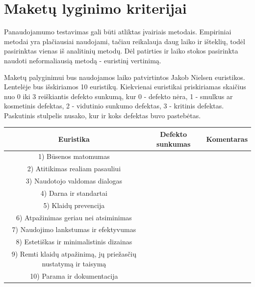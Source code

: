 \documentclass{VUMIFPSkursinis}
\begin{document}
\section{Maketų lyginimo kriterijai}
Panaudojamumo testavimas gali būti atliktas įvairiais metodais. Empiriniai metodai yra plačiausiai naudojami\cite{NielsenUsabilityEn}, tačiau reikalauja daug laiko ir išteklių, todėl pasirinktas vienas iš analitinių metodų. Dėl patirties ir laiko stokos pasirinkta naudoti neformaliausią metodą - euristinį vertinimą.

Maketų palyginimui bus naudojamos laiko patvirtintos Jakob Nielsen euristikos\cite{NielsenHeuristicsEn}. Lentelėje bus išskiriamos 10 euristikų. Kiekvienai euristikai priskiriamas skaičius nuo 0 iki 3 reiškiantis defekto sunkumą, kur 0 - defekto nėra, 1 - smulkus ar kosmetinis defektas, 2 - vidutinio sunkumo defektas, 3 - kritinis defektas. Paskutinis stulpelis nusako, kur ir koks defektas buvo pastebėtas.%
\begin{center}
\begin{tabular}{ |c|c|c| } 
 \hline
	Euristika & Defekto sunkumas & Komentaras \\ \hline
	1) Būsenos matomumas &  &  \\ \hline
	2) Atitikimas realiam pasauliui  &  &  \\ \hline
	3) Naudotojo valdomas dialogas &  &  \\ \hline
	4) Darna ir standartai &  &  \\ \hline
	5) Klaidų prevencija &  &  \\ \hline
	6) Atpažinimas geriau nei atsiminimas &  &  \\ \hline
	7) Naudojimo lankstumas ir efektyvumas &  &  \\ \hline
	8) Estetiškas ir minimalistinis dizainas &  &  \\ \hline
	9) Remti klaidų atpažinimą, jų priežasčių nustatymą ir taisymą &  &  \\ \hline
	10) Parama ir dokumentacija &  &  \\ \hline
\end{tabular}
\label{euristikųlentelėpvz}
\end{center}
\end{document}
